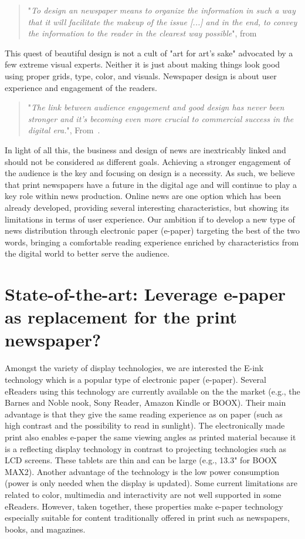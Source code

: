 \documentclass[10pt]{article}
\begin{document}
\begin{quote}
"{\itshape To design an newspaper means to organize the information in such a way that it will facilitate the makeup of the issue [...] and in the end, to convey the information to the reader in the clearest way possible}",
from~\cite{vignellivignelli:07}
\end{quote}

This quest of beautiful design is not a cult of "art for art's sake" advocated by a few extreme visual experts. Neither it is just about making things look good using proper grids, type, color, and visuals. Newspaper design is about user experience and engagement of the readers.

\begin{quote}
"{\itshape The link between audience engagement and good design has never been stronger and it's becoming even more crucial to commercial success in the digital era.}",
From~\cite{morell:16}. 
\end{quote}

In light of all this, the business and design of news are inextricably linked and should not be considered as different goals. 
Achieving a stronger engagement of the audience is the key and focusing on design is a necessity.  
As such, we believe that print newspapers have a future in the digital age and will continue to play a key role within news production. 
Online news are one option which has been already developed, providing several interesting characteristics, but showing its limitations in terms of user experience.
Our ambition if to develop a new type of news distribution through electronic paper (e-paper) targeting the best of the two words, bringing a comfortable reading experience enriched by characteristics from the digital world to better serve the audience. 




\section{State-of-the-art: Leverage e-paper as replacement for the print newspaper?}

Amongst the variety of display technologies, we are interested the E-ink technology which is a popular type of electronic paper (e-paper).
Several eReaders using this technology are currently available on the the market (e.g., the Barnes and Noble nook, Sony Reader, Amazon Kindle or BOOX). 
Their main advantage is that they give the same reading experience as on paper (such as high contrast and the possibility to read in sunlight).
The electronically made print also enables e-paper the same viewing angles as printed material because it is a reflecting display technology in contrast to projecting technologies such as LCD screens.
These tablets are thin and can be large (e.g., 13.3" for BOOX MAX2).
Another advantage of the technology is the low power consumption (power is only needed when the display is updated). 
Some current limitations are related to color, multimedia and interactivity are not well supported in some eReaders.
However, taken together, these properties make e-paper technology especially suitable for content traditionally offered in print such as newspapers, books, and magazines. 
\end{document}
